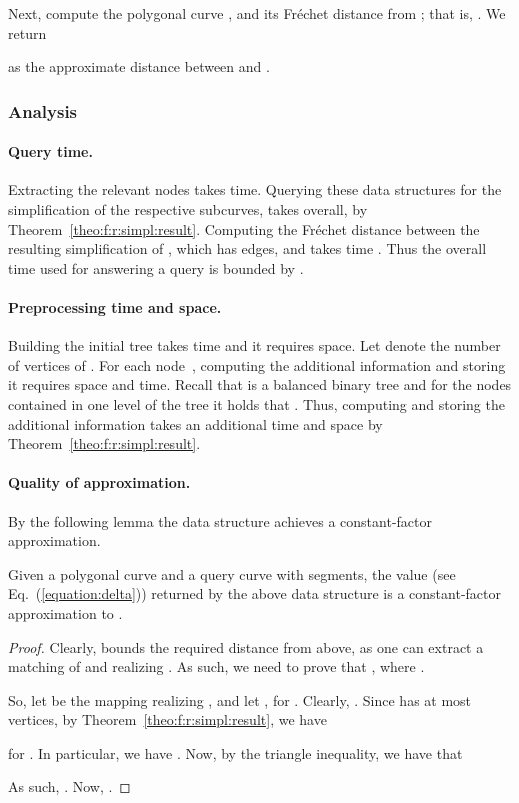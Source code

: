 \documentclass[12pt]{article}
\newcommand{\thmref}[1]{Theorem~\ref{theo:#1}}
\newcommand{\lemlab}[1]{\label{lemma:#1}}
\newcommand{\Eqref}[1]{Eq.~(\ref{equation:#1})}
\newcommand{\Frechet}{Fr\'{e}c{h}e{}t\xspace}\providecommand{\Arr}{\mathop{\mathrm{\EuScript{A}}}}
\numberwithin{figure}{section}
\numberwithin{equation}{section}
\newcommand{\matching}{matching\xspace}
\begin{document}
Next, compute the polygonal curve , and its \Frechet distance from
; that is, .  We return

as the approximate distance between  and .

\subsubsection{Analysis}

\paragraph{Query time.}
Extracting the  relevant nodes takes  time.
Querying these  data structures for the simplification of the
respective subcurves, takes  overall, by
\thmref{f:r:simpl:result}.  Computing the \Frechet distance between
the resulting simplification  of , which has  edges, and  takes  time
\cite{ag-cfdbt-95}.  Thus the overall time used for answering a query
is bounded by .

\paragraph{Preprocessing time and space.}
Building the initial tree  takes  time and it requires
 space.  Let  denote the number of vertices of
.  For each node~, computing the additional
information and storing it requires  space and
 time.  Recall that
 is a balanced binary tree and for the nodes  contained in one level of the tree it holds that . Thus, computing and storing the
additional information takes an additional  time
and  space by \thmref{f:r:simpl:result}.



\paragraph{Quality of approximation.}
By the following lemma the data structure achieves a constant-factor
approximation.


\begin{lemma}\lemlab{k:seg:query:vertices}Given a polygonal curve  and a query curve  with 
    segments, the value  (see \Eqref{delta}) returned by the
    above data structure is a constant-factor approximation to
    .
\end{lemma}
\begin{proof}
    Clearly,  bounds the required distance from above, as one
    can extract a \matching{} of  and  realizing
    . As such, we need to prove that , where .
    
    So, let  be the mapping
    realizing , and let , for . Clearly, .  Since  has at
    most  vertices, by \thmref{f:r:simpl:result}, we have
    
    for .  In particular, we have .
    Now, by the triangle inequality, we have that
    
    As such, .  Now, .
\end{proof}
\end{document}
